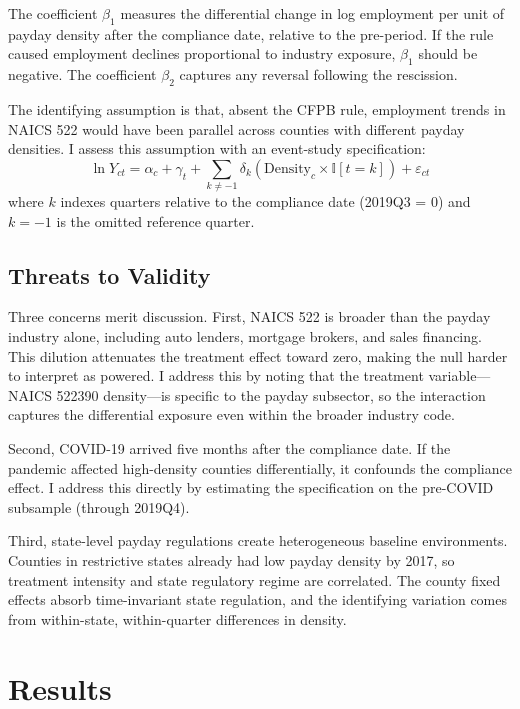 \documentclass[12pt]{article}
\newcommand{\ind}{\mathbb{I}}
\begin{document}
The coefficient $\beta_1$ measures the differential change in log employment per unit of payday density after the compliance date, relative to the pre-period. If the rule caused employment declines proportional to industry exposure, $\beta_1$ should be negative. The coefficient $\beta_2$ captures any reversal following the rescission.

The identifying assumption is that, absent the CFPB rule, employment trends in NAICS 522 would have been parallel across counties with different payday densities. I assess this assumption with an event-study specification:
\begin{equation}
\ln Y_{ct} = \alpha_c + \gamma_t + \sum_{k \neq -1} \delta_k (\text{Density}_c \times \ind[t = k]) + \varepsilon_{ct}
\label{eq:eventstudy}
\end{equation}
where $k$ indexes quarters relative to the compliance date (2019Q3 = 0) and $k = -1$ is the omitted reference quarter.

\subsection{Threats to Validity}

Three concerns merit discussion. First, NAICS 522 is broader than the payday industry alone, including auto lenders, mortgage brokers, and sales financing. This dilution attenuates the treatment effect toward zero, making the null harder to interpret as powered. I address this by noting that the treatment variable---NAICS 522390 density---is specific to the payday subsector, so the interaction captures the differential exposure even within the broader industry code.

Second, COVID-19 arrived five months after the compliance date. If the pandemic affected high-density counties differentially, it confounds the compliance effect. I address this directly by estimating the specification on the pre-COVID subsample (through 2019Q4).

Third, state-level payday regulations create heterogeneous baseline environments. Counties in restrictive states already had low payday density by 2017, so treatment intensity and state regulatory regime are correlated. The county fixed effects absorb time-invariant state regulation, and the identifying variation comes from within-state, within-quarter differences in density.


\section{Results}
\end{document}
